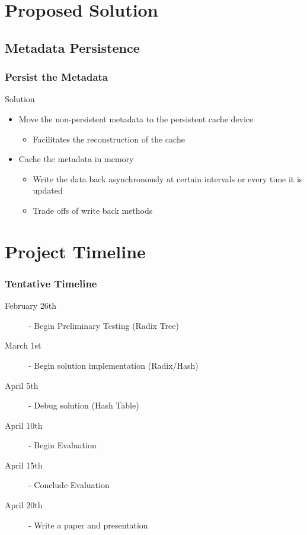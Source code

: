 \documentclass{beamer}
\begin{document}


\section{Proposed Solution}

\subsection{Metadata Persistence}

\begin{frame}
  \frametitle{Persist the Metadata}

  Solution
  \begin{itemize}
    \item Move the non-persistent metadata to the persistent cache
    device
    \begin{itemize}
      \item Facilitates the reconstruction of the cache
    \end{itemize}
    \item Cache the metadata in memory
    \begin{itemize}
      \item Write the data back asynchronously at certain intervals or
      every time it is updated
      \item Trade offs of write back methods
    \end{itemize}
  \end{itemize}

\end{frame}



\section{Project Timeline}

\begin{frame}
  \frametitle{Tentative Timeline}
  \begin{description}
    \item[February 26th] - Begin Preliminary Testing (Radix Tree)
    \item[March 1st] - Begin solution implementation (Radix/Hash)
    \item[April 5th] - Debug solution (Hash Table)
    \item[April 10th] - Begin Evaluation
    \item[April 15th] - Conclude Evaluation
    \item[April 20th] - Write a paper and presentation
  \end{description}
\end{frame}
\end{document}
